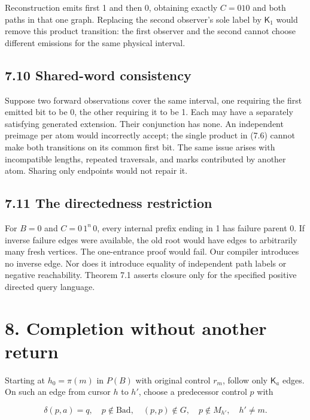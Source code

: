 \documentclass[
  11pt,
  a4paper,
]{article}
\newcounter{none} %
\begin{document}
Reconstruction emits first 1 and then 0, obtaining exactly \(C=010\) and
both paths in that one graph. Replacing the second observer's sole label
by \(\mathsf K_1\) would remove this product transition: the first
observer and the second cannot choose different emissions for the same
physical interval.

\subsection{7.10 Shared-word consistency}\label{shared-word-consistency}

Suppose two forward observations cover the same interval, one requiring
the first emitted bit to be 0, the other requiring it to be 1. Each may
have a separately satisfying generated extension. Their conjunction has
none. An independent preimage per atom would incorrectly accept; the
single product in (7.6) cannot make both transitions on its common first
bit. The same issue arises with incompatible lengths, repeated
traversals, and marks contributed by another atom. Sharing only
endpoints would not repair it.

\subsection{7.11 The directedness
restriction}\label{the-directedness-restriction}

For \(B=0\) and \(C=0\,1^n\,0\), every internal prefix ending in 1 has
failure parent 0. If inverse failure edges were available, the old root
would have edges to arbitrarily many fresh vertices. The one-entrance
proof would fail. Our compiler introduces no inverse edge. Nor does it
introduce equality of independent path labels or negative reachability.
Theorem 7.1 asserts closure only for the specified positive directed
query language.


\section{8. Completion without another
return}\label{completion-without-another-return}

Starting at \(h_0=\pi(m)\) in \(P(B)\) with original control \(r_m\),
follow only \(\mathsf K_a\) edges. On such an edge from cursor \(h\) to
\(h'\), choose a predecessor control \(p\) with

\[\delta(p,a)=q,\quad p\notin\mathrm{Bad},\quad(p,p)\notin G,
\quad p\notin M_{h'},\quad h'\ne m.\]
\end{document}
